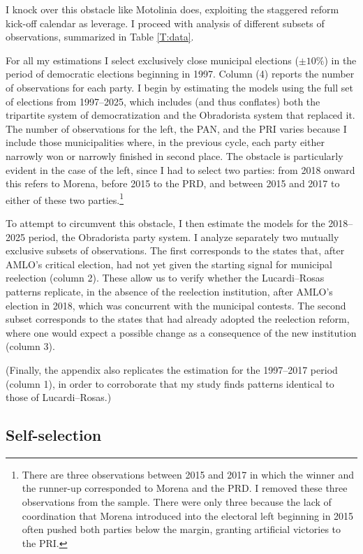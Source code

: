 \documentclass[letter,12pt]{article}
\begin{document}
I knock over this obstacle like Motolinia does, exploiting the staggered reform kick-off calendar as leverage. I proceed with analysis of different subsets of observations, summarized in Table \ref{T:data}.

For all my estimations I select exclusively close municipal elections ($\pm10\%$) in the period of democratic elections beginning in 1997. Column (4) reports the number of observations for each party. I begin by estimating the models using the full set of elections from 1997--2025, which includes (and thus conflates) both the tripartite system of democratization and the Obradorista system that replaced it. The number of observations for the left, the PAN, and the PRI varies because I include those municipalities where, in the previous cycle, each party either narrowly won or narrowly finished in second place. The obstacle is particularly evident in the case of the left, since I had to select two parties: from 2018 onward this refers to Morena, before 2015 to the PRD, and between 2015 and 2017 to either of these two parties.\footnote{There are three observations between 2015 and 2017 in which the winner and the runner-up corresponded to Morena and the PRD. I removed these three observations from the sample. There were only three because the lack of coordination that Morena introduced into the electoral left beginning in 2015 often pushed both parties below the margin, granting artificial victories to the PRI.}

To attempt to circumvent this obstacle, I then estimate the models for the 2018--2025 period, the Obradorista party system. I analyze separately two mutually exclusive subsets of observations. The first corresponds to the states that, after AMLO’s critical election, had not yet given the starting signal for municipal reelection (column 2). These allow us to verify whether the Lucardi--Rosas patterns replicate, in the absence of the reelection institution, after AMLO’s election in 2018, which was concurrent with the municipal contests. The second subset corresponds to the states that had already adopted the reelection reform, where one would expect a possible change as a consequence of the new institution (column 3).

(Finally, the appendix also replicates the estimation for the 1997--2017 period (column 1), in order to corroborate that my study finds patterns identical to those of Lucardi--Rosas.)

\subsection{Self-selection}
\end{document}
